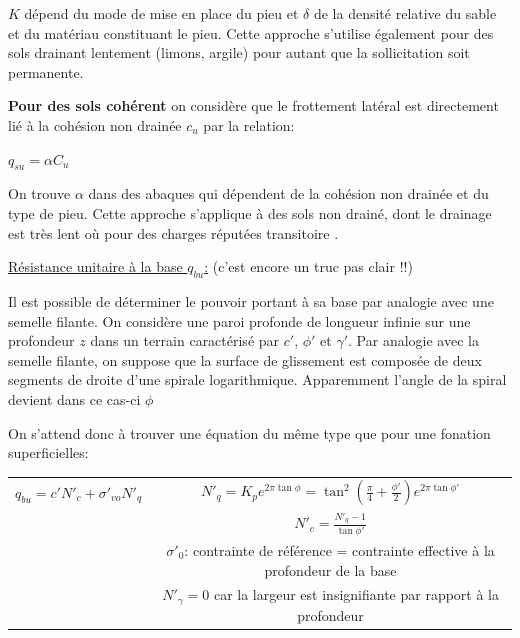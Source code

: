         $K$ dépend du mode de mise en place du pieu et $\delta$ de la densité relative du sable et du matériau constituant le pieu. Cette approche s'utilise également pour des sols drainant lentement (limons, argile) pour autant que la sollicitation soit permanente.
        
        \textbf{Pour des sols cohérent} on considère que le frottement latéral est directement lié à la cohésion non drainée $c_u$ par la relation: 
        
        \begin{center}
            $q_{su} = \alpha C_u$
        \end{center} 
        
        On trouve $\alpha$ dans des abaques qui dépendent de la cohésion non drainée et du type de pieu. Cette approche s'applique à des sols non drainé, dont le drainage est très lent où pour des charges réputées transitoire .
        
        \underline{Résistance unitaire à la base $q_{bu}$:} (c'est encore un truc pas clair !!) 
        
        Il est possible de déterminer le pouvoir portant à sa base par analogie avec une semelle filante. On considère une paroi profonde de longueur infinie sur une profondeur $z$ dans un terrain caractérisé par $c'$, $\phi'$ et $\gamma'$. Par analogie avec la semelle filante, on suppose que la surface de glissement est composée de deux segments de droite d'une spirale logarithmique. Apparemment l'angle de la spiral devient dans ce cas-ci $\phi$ 
        
        On s'attend donc à trouver une équation du même type que pour une fonation superficielles:
        
        \begin{center}
        \begin{tabular}{c|c}
            $q_{bu} = c' N'_c + \sigma'_{vo} N'_q$ \: \: \: 
             &  $N'_q = K_p e^{2 \pi \tan \phi} = \tan^2 (\frac{\pi}{4} + \frac{\phi'}{2}) e^{2\pi \tan \phi'}$  \\
             &  $N'_c = \frac{N'_q-1}{\tan \phi'} $  \\
             &  $\sigma'_0$: contrainte de référence = contrainte effective à la profondeur de la base  \\
             &  $N'_{\gamma} = 0$ car la largeur est insignifiante par rapport à la profondeur  
        \end{tabular}
        \end{center}
        
